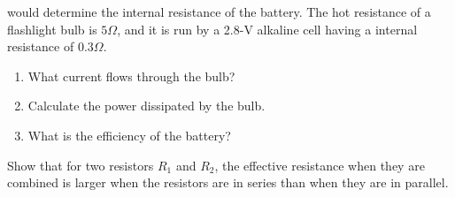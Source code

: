 \documentclass[12pt,addpoints]{exam}
\begin{document}
\begin{questions}
		would determine the internal resistance of the battery.\vspace{1.5in}
		\question The hot resistance of a flashlight bulb is $5\Omega$, and it is run by a 2.8-V alkaline cell having a internal
		resistance of $0.3\Omega$.
		\begin{enumerate}[label=(\roman*)]
			\item What current flows through the bulb?\vspace{1in}
			\item Calculate the power dissipated by the bulb.\vspace{1in}
			\item What is the efficiency of the battery?\vspace{1in}
		\end{enumerate} 
		\question Show that for two resistors $R_1$ and $R_2$, the effective resistance when they are combined is larger when the resistors are in series than when they are in parallel.\newpage

\end{questions}
\end{document}

